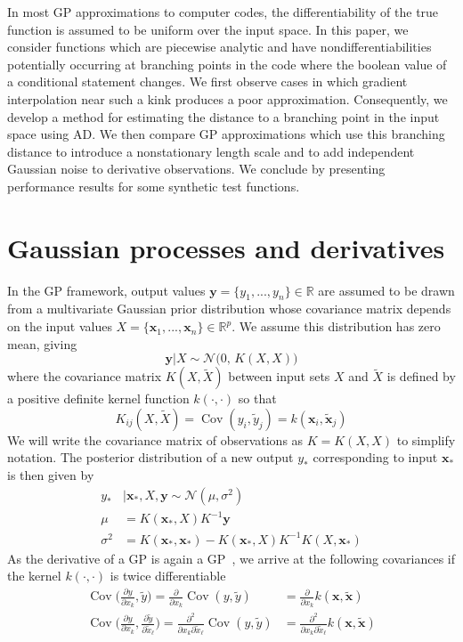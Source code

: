 \documentclass{article}
\renewcommand{\vec}[1]{\mathbf{#1}}
\newcommand{\R}{\mathbb{R}}
\newcommand{\N}{\mathcal{N}}
\DeclareMathOperator{\Cov}{Cov}
\begin{document}
In most GP approximations to computer codes, the differentiability of the true function is assumed to be uniform over the input space. In this paper, we consider functions which are piecewise analytic and have nondifferentiabilities potentially occurring at branching points in the code where the boolean value of a conditional statement changes. We first observe cases in which gradient interpolation near such a kink produces a poor approximation. Consequently, we develop a method for estimating the distance to a branching point in the input space using AD. We then compare GP approximations which use this branching distance to introduce a nonstationary length scale and to add independent Gaussian noise to derivative observations. We conclude by presenting performance results for some synthetic test functions.

\section{Gaussian processes and derivatives}
In the GP framework, output values $\vec{y} = \{y_1,...,y_n\} \in \R$ are assumed to be drawn from a multivariate Gaussian prior distribution whose covariance matrix depends on the input values $X = \{\vec{x}_1,...,\vec{x}_n\} \in \R^p$. We assume this distribution has zero mean, giving
$$ \vec{y} | X \sim \N\Big(0, \, K(X,X)\Big) $$
where the covariance matrix $K(X,\tilde{X})$ between input sets $X$ and $\tilde{X}$ is defined by a positive definite kernel function $k(\cdot, \cdot)$ so that
$$K_{ij}(X,\tilde{X}) = \Cov(y_i, \tilde{y}_j) = k(\vec{x}_i, \tilde{\vec{x}}_j)$$
We will write the covariance matrix of observations as $K = K(X,X)$ to simplify notation. The posterior distribution of a new output $y_*$ corresponding to input $\vec{x}_*$ is then given by
\begin{align*}
    y_* &| \vec{x}_*,X,\vec{y} \sim \N(\mu, \sigma^2) \\
    \mu & = K(\vec{x}_*, X)K^{-1}\vec{y} \\
    \sigma^2 & = K(\vec{x}_*, \vec{x}_*) - K(\vec{x}_*, X)K^{-1}K(X, \vec{x}_*)
\end{align*}
As the derivative of a GP is again a GP~\cite{bernardo1992some}, we arrive at the following covariances if the kernel $k(\cdot, \cdot)$ is twice differentiable
\begin{align*}
    \Cov\Big(\frac{\partial y}{\partial x_k}, \tilde{y}\Big)
    = \frac{\partial}{\partial x_k} \Cov(y, \tilde{y})
    &= \frac{\partial}{\partial x_k} k(\vec{x}, \tilde{\vec{x}}) \\
    \Cov\Big(\frac{\partial y}{\partial x_k}, \frac{\partial\tilde{y}}{\partial \tilde{x}_\ell}\Big)
    = \frac{\partial^2}{\partial x_k \partial \tilde{x}_\ell} \Cov(y, \tilde{y})
    &= \frac{\partial^2}{\partial x_k \partial \tilde{x}_\ell} k(\vec{x}, \tilde{\vec{x}})
\end{align*}
\end{document}
